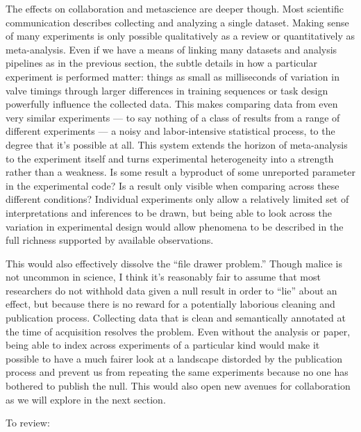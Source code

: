 The effects on collaboration and metascience are deeper though. Most
scientific communication describes collecting and analyzing a single
dataset. Making sense of many experiments is only possible qualitatively
as a review or quantitatively as meta-analysis. Even if we have a means
of linking many datasets and analysis pipelines as in the previous
section, the subtle details in how a particular experiment is performed
matter: things as small as milliseconds of variation in valve timings
through larger differences in training sequences or task design
powerfully influence the collected data. This makes comparing data from
even very similar experiments --- to say nothing of a class of results
from a range of different experiments --- a noisy and labor-intensive
statistical process, to the degree that it's possible at all. This
system extends the horizon of meta-analysis to the experiment itself and
turns experimental heterogeneity into a strength rather than a weakness.
Is some result a byproduct of some unreported parameter in the
experimental code? Is a result only visible when comparing across these
different conditions? Individual experiments only allow a relatively
limited set of interpretations and inferences to be drawn, but being
able to look across the variation in experimental design would allow
phenomena to be described in the full richness supported by available
observations.

This would also effectively dissolve the ``file drawer problem.'' \citep{sterlingPublicationDecisionsTheir1959, francoPublicationBiasSocial2014}  Though malice is not uncommon in
science, I think it's reasonably fair to assume that most researchers do
not withhold data given a null result in order to ``lie'' about an
effect, but because there is no reward for a potentially laborious
cleaning and publication process. Collecting data that is clean and
semantically annotated at the time of acquisition resolves the problem.
Even without the analysis or paper, being able to index across
experiments of a particular kind would make it possible to have a much
fairer look at a landscape distorded by the publication process and
prevent us from repeating the same experiments because no one has
bothered to publish the null. This would also open new avenues for
collaboration as we will explore in the next section.

To review:

